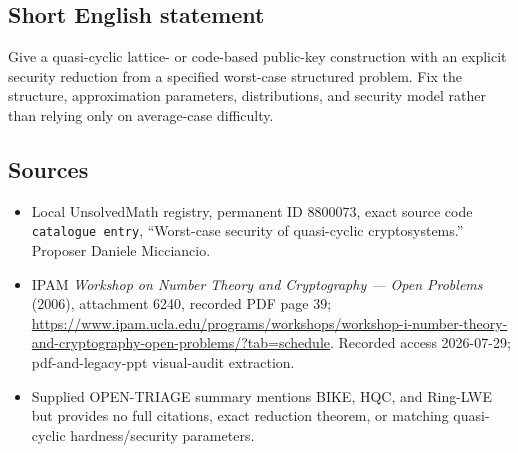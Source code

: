 \documentclass[11pt]{article}
\begin{document}
\subsection{Short English statement}
Give a quasi-cyclic lattice- or code-based public-key construction with an explicit security reduction from a specified worst-case structured problem. Fix the structure, approximation parameters, distributions, and security model rather than relying only on average-case difficulty.
\subsection{Sources}
\begin{itemize}
\item Local UnsolvedMath registry, permanent ID \(8800073\), exact source code \texttt{catalogue entry}, ``Worst-case security of quasi-cyclic cryptosystems.'' Proposer Daniele Micciancio.
\item IPAM \emph{Workshop on Number Theory and Cryptography --- Open Problems} (2006), attachment 6240, recorded PDF page 39; \url{https://www.ipam.ucla.edu/programs/workshops/workshop-i-number-theory-and-cryptography-open-problems/?tab=schedule}. Recorded access 2026-07-29; pdf-and-legacy-ppt visual-audit extraction.
\item Supplied OPEN-TRIAGE summary mentions BIKE, HQC, and Ring-LWE but provides no full citations, exact reduction theorem, or matching quasi-cyclic hardness/security parameters.
\end{itemize}
\end{document}
